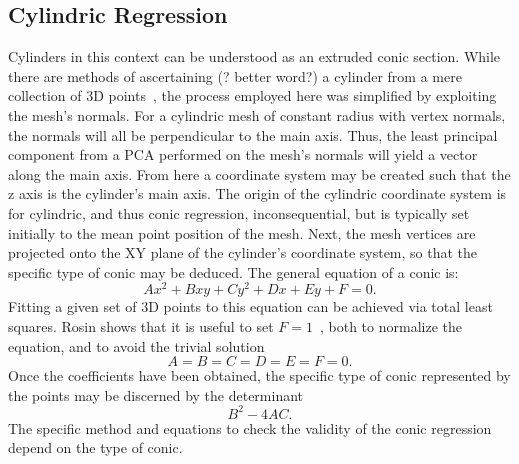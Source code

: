 \subsection{Cylindric Regression}
Cylinders in this context can be understood as an extruded conic section.
While there are methods of ascertaining (? better word?) a cylinder from a mere collection of 3D points~\cite{PCL_cyl_regression}, the process employed here was simplified by exploiting the mesh's normals.
For a cylindric mesh of constant radius with vertex normals, the normals will all be perpendicular to the main axis.
Thus, the least principal component from a PCA performed on the mesh's normals will yield a vector along the main axis.
From here a coordinate system may be created such that the z axis is the cylinder's main axis.
The origin of the cylindric coordinate system is for cylindric, and thus conic regression, inconsequential, but is typically set initially to the mean point position of the mesh.
Next, the mesh vertices are projected onto the XY plane of the cylinder's coordinate system, so that the specific type of conic may be deduced.
The general equation of a conic is:
\begin{equation}\label{eq:gen_conic}
	Ax^2 + Bxy + Cy^2 + Dx + Ey + F = 0.
\end{equation}
Fitting a given set of 3D points to this equation can be achieved via total least squares.
Rosin shows that it is useful to set $F=1$~\cite{Ellipse_least_squares}, both to normalize the equation, and to avoid the trivial solution
\begin{equation}
	A = B = C = D = E = F = 0.
\end{equation}
Once the coefficients have been obtained, the specific type of conic represented by the points may be discerned by the determinant
\begin{equation*}
	B^2 - 4AC.
\end{equation*}
The specific method and equations to check the validity of the conic regression depend on the type of conic.

